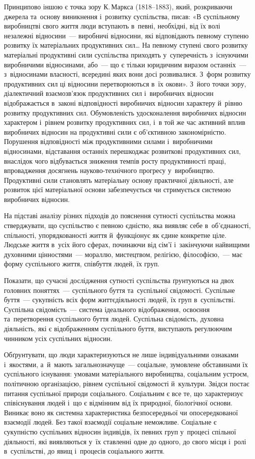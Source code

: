\documentclass[a5paper,oneside,DIV=12,12pt,headings=small]{scrartcl}
\begin{document}
		Принципово іншою є точка зору К.\,Маркса (1818–1883), який, розкриваючи джерела та~основу виникнення і~розвитку суспільства, писав: «В суспільному виробництві свого життя люди вступають в~певні, необхідні, від їх волі незалежні відносини~— виробничі відносини, які відповідають певному ступеню розвитку їх матеріальних продуктивних сил… На певному ступені свого розвитку матеріальні продуктивні сили суспільства приходять у~суперечність з~існуючими виробничими відносинами, або~— що є тільки юридичним виразом останніх~— з~відносинами власності, всередині яких вони досі розвивалися. З~форм розвитку продуктивних сил ці відносини перетворюються в~їх окови». З~його точки зору, діалектичний взаємозв'язок продуктивних сил і~виробничих відносин відображається в~законі відповідності виробничих відносин характеру й~рівню розвитку продуктивних сил. Обумовленість удосконалення виробничих відносин характером і~рівнем розвитку продуктивних сил, і~в той же час активний вплив виробничих відносин на продуктивні сили є об'\-єктивною закономірністю. Порушення відповідності між продуктивними силами і~виробничими відносинами, відставання останніх перешкоджає розвиткові продуктивних сил, внаслідок чого відбувається зниження темпів росту продуктивності праці, впровадження досягнень науково-технічного прогресу у~виробництво. Продуктивні сили становлять матеріальну основу практичної діяльності, але розвиток цієї матеріальної основи забезпечується чи стримується системою виробничих відносин.

		На підставі аналізу різних підходів до пояснення сутності суспільства можна стверджувати, що суспільство є певною єдністю, яка виявляє себе в~об'єднаності, спільності, упорядкованості життя й~функціонує як єдине конкретне ціле. Людське життя в~усіх його сферах, починаючи від сім'ї і~закінчуючи найвищими духовними цінностями~— мораллю, мистецтвом, релігією, філософією,~— має форму суспільного життя, співбуття людей, їх груп.

		Показати, що сучасні дослідження сутності суспільства ґрунтуються на двох головних поняттях~— суспільного буття та~суспільної свідомості. Суспільне буття~— сукупність всіх форм життєдіяльності людей, їх груп в~суспільстві. Суспільна свідомість~— система ідеального відображення, освоєння та~перетворення суспільного буття людей. Суспільна свідомість, духовна діяльність, які є відображенням суспільного буття, виступають регулюючим чинником усіх суспільних відносин.

		Обґрунтувати, що люди характеризуються не лише індивідуальними ознаками і~якостями, а~й~мають загальнозначуще~— соціальне, зумовлене обставинами їх суспільного існування: умовами матеріального виробництва, соціальним устроєм, політичною організацією, рівнем суспільної свідомості й~культури. Звідси постає питання суспільної природи соціального. Соціальним є все те, що характеризує співіснування людей і~що є відмінним від їх природної, біологічної основи. Виникає воно як системна характеристика безпосередньої чи опосередкованої взаємодії людей. Без такої взаємодії соціальне неможливе. Соціальне є сукупністю суспільних відносин індивідів, їх певних груп у~процесі спільної діяльності, які виявляються у~їх ставленні одне до одного, до свого місця і~ролі в~суспільстві, до явищ і~процесів соціального життя.
		 
\end{document}
